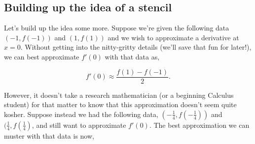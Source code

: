 \documentclass[paper=a4, fontsize=11pt]{scrartcl} %
\numberwithin{equation}{section} %
\numberwithin{figure}{section} %
\numberwithin{table}{section} %
\begin{document}







 
%
%
%
%
%
%
\subsection{Building up the idea of a stencil}

Let's build up the idea some more. Suppose we're given the following data $(-1,f(-1))$ and $(1,f(1))$ and we wish to approximate a derivative at $x=0.$ Without getting into the nitty-gritty details (we'll save that fun for later!), we can best approximate $f'(0)$ with that data as,

$$f'(0)\approx \frac{f(1) - f(-1)}{2}.$$

However, it doesn't take a research mathematician (or a beginning Calculus student) for that matter to know that this approximation doesn't seem quite kosher. Suppose instead we had the following data, $(-\frac{1}{4},f(-\frac{1}{4}))$ and $(\frac{1}{4},f(\frac{1}{4})$, and still want to approximate $f'(0)$. The best approximation we can muster with that data is now,
\end{document}
